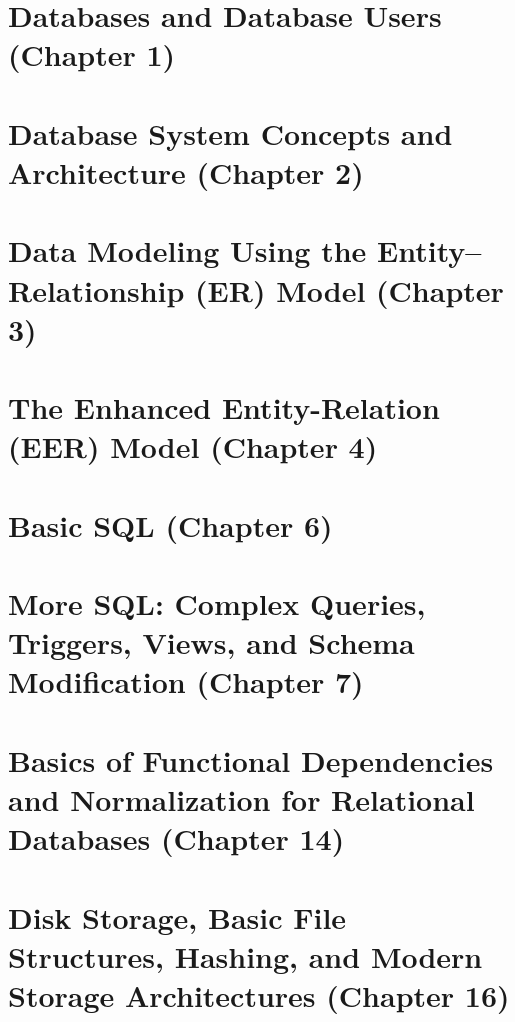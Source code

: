 \documentclass{report}
\begin{document}
\tableofcontents

\chapter{Databases and Database Users (Chapter 1)}



\chapter{Database System Concepts and Architecture (Chapter 2)}



\chapter{Data Modeling Using the Entity–Relationship (ER) Model (Chapter 3)}  



\chapter{The Enhanced Entity-Relation (EER) Model (Chapter 4)}



\chapter{Basic SQL (Chapter 6)}


\chapter{More SQL: Complex Queries, Triggers, Views, and Schema Modification (Chapter 7)}



\chapter{Basics of Functional Dependencies and Normalization for Relational Databases (Chapter 14)}


\chapter{Disk Storage, Basic File Structures, Hashing, and Modern Storage Architectures (Chapter 16)}

\end{document}
